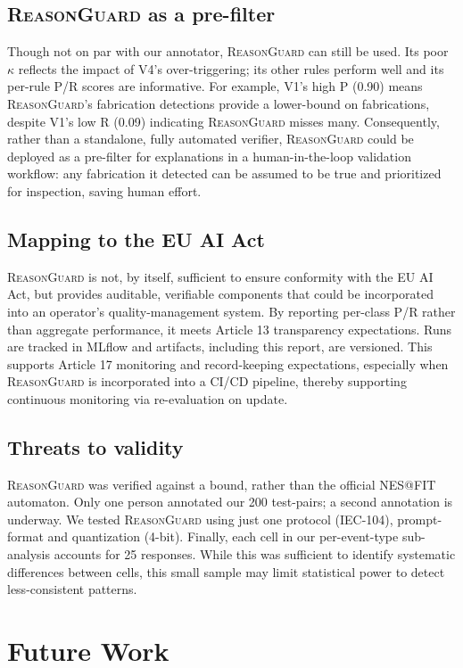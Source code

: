 \documentclass[conference]{IEEEtran}
\newcommand{\rg}{\textsc{ReasonGuard}}
\begin{document}
\subsection{\rg{} as a pre-filter}
Though not on par with our annotator, \rg{} can still be used. Its poor $\kappa$ reflects the impact of V4's over-triggering; its other rules perform well and its per-rule P/R scores are informative. For example, V1's high P (0.90) means \rg's fabrication detections provide a lower-bound on fabrications, despite V1's low R (0.09) indicating \rg{} misses many. Consequently, rather than a standalone, fully automated verifier, \rg{} could be deployed as a pre-filter for explanations in a human-in-the-loop validation workflow: any fabrication it detected can be assumed to be true and prioritized for inspection, saving human effort.

\subsection{Mapping to the EU AI Act}
\rg{} is not, by itself, sufficient to ensure conformity with the EU AI Act, but provides auditable, verifiable components that could be incorporated into an operator's quality-management system. By reporting per-class P/R rather than aggregate performance, it meets Article 13 transparency expectations. Runs are tracked in MLflow and artifacts, including this report, are versioned. This supports Article 17 monitoring and record-keeping expectations, especially when \rg{} is incorporated into a CI/CD pipeline, thereby supporting continuous monitoring via re-evaluation on update.

\subsection{Threats to validity}
\rg{} was verified against a bound, rather than the official NES@FIT automaton. Only one person annotated our 200 test-pairs; a second annotation is underway. We tested \rg{} using just one protocol (IEC-104), prompt-format and quantization (4-bit). Finally, each cell in our per-event-type sub-analysis accounts for 25 responses. While this was sufficient to identify systematic differences between cells, this small sample may limit statistical power to detect less-consistent patterns.

\section{Future Work}\label{sec:future}
\end{document}
